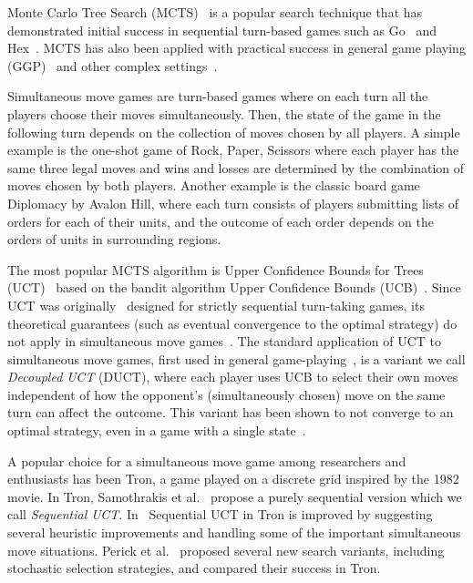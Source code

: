 \documentclass[conference]{IEEEtran}
\begin{document}
Monte Carlo Tree Search (MCTS)~\cite{Coulom06Efficient,Kocsis06Bandit} is a popular search technique 
that has demonstrated initial success in sequential turn-based games such as Go~\cite{Gelly12} and Hex~\cite{Arneson10Hex}.
 MCTS has also been applied with practical success in general game playing (GGP)~\cite{Bjornsson09CadiaPlayer} and other 
complex settings~\cite{Browne12MCTSSurvey}. 

Simultaneous move games are turn-based games where on each turn all the players choose their moves simultaneously.
Then, the state of the game in the following turn depends on the collection of moves chosen by all players. 
A simple example is the one-shot game of Rock, Paper, Scissors where each player has the same three legal moves 
and wins and losses are determined by the combination of moves chosen by both players. 
Another example is the classic board game Diplomacy by Avalon Hill, where each turn consists of players submitting 
lists of orders for each of their units, and the outcome of each order depends on the orders of units in surrounding regions. 

The most popular MCTS algorithm is Upper Confidence Bounds for Trees (UCT)~\cite{Kocsis06Bandit} based on the bandit algorithm 
Upper Confidence Bounds (UCB)~\cite{Auer02Finite}. Since UCT was originally~\cite{Shafiei09} 
designed for strictly sequential turn-taking games, its theoretical guarantees (such as eventual convergence to the optimal 
strategy) do not apply in simultaneous move games~\cite{Shafiei09}. The standard application of UCT to simultaneous move games, 
first used in general game-playing~\cite{Cadiaplayer}, is a variant we call {\it Decoupled UCT} (DUCT), where each player uses UCB to select 
their own moves independent of how the opponent's (simultaneously chosen) move on the same turn can affect the outcome. 
This variant has been shown to not converge to an optimal strategy, even in a game with a single state~\cite{Shafiei09}.

A popular choice for a simultaneous move game among researchers and enthusiasts has been Tron, a game played on a discrete 
grid inspired by the 1982 movie.
In Tron, Samothrakis et al.~\cite{Samothrakis10Tron} propose a purely sequential version which we call {\it Sequential UCT}. 
In~\cite{DenTeuling12Tron} Sequential UCT in Tron is improved by suggesting several heuristic improvements and handling some of the 
important simultaneous move situations. Perick et al.~\cite{Perick12Comparison} proposed several new 
search variants, including stochastic selection strategies, and compared their success in Tron. 
\end{document}
